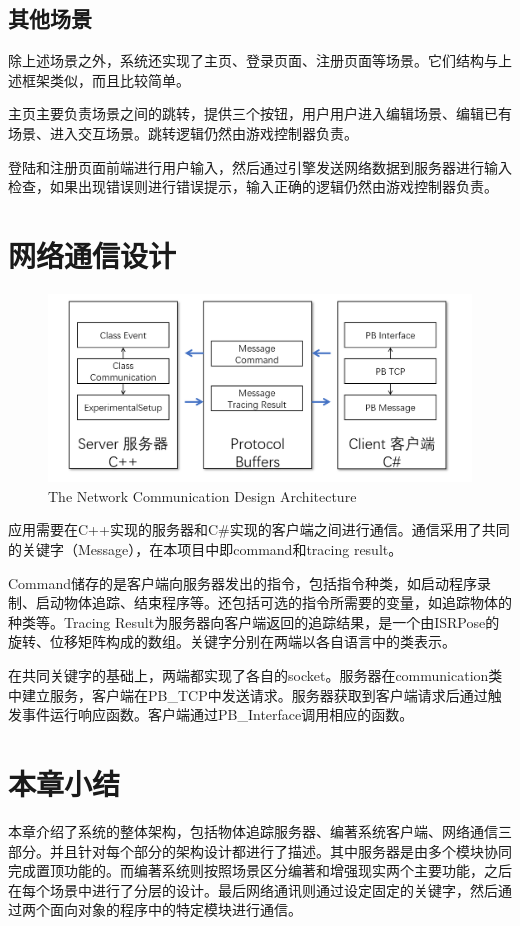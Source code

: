 \subsection{其他场景}
除上述场景之外，系统还实现了主页、登录页面、注册页面等场景。它们结构与上述框架类似，而且比较简单。

主页主要负责场景之间的跳转，提供三个按钮，用户用户进入编辑场景、编辑已有场景、进入交互场景。跳转逻辑仍然由游戏控制器负责。

登陆和注册页面前端进行用户输入，然后通过引擎发送网络数据到服务器进行输入检查，如果出现错误则进行错误提示，输入正确的逻辑仍然由游戏控制器负责。

\section{网络通信设计}
\begin{figure}[!htp]
  \centering
  \includegraphics[width=12cm]{figure/netarc.png}
    {The Network Communication Design Architecture}
 \label{fig:gm}
\end{figure}
应用需要在C++实现的服务器和C\#实现的客户端之间进行通信。通信采用了共同的关键字（Message），在本项目中即command和tracing result。

Command储存的是客户端向服务器发出的指令，包括指令种类，如启动程序录制、启动物体追踪、结束程序等。还包括可选的指令所需要的变量，如追踪物体的种类等。Tracing Result为服务器向客户端返回的追踪结果，是一个由ISRPose的旋转、位移矩阵构成的数组。关键字分别在两端以各自语言中的类表示。

在共同关键字的基础上，两端都实现了各自的socket。服务器在communication类中建立服务，客户端在PB\_TCP中发送请求。服务器获取到客户端请求后通过触发事件运行响应函数。客户端通过PB\_Interface调用相应的函数。

\section{本章小结}
本章介绍了系统的整体架构，包括物体追踪服务器、编著系统客户端、网络通信三部分。并且针对每个部分的架构设计都进行了描述。其中服务器是由多个模块协同完成置顶功能的。而编著系统则按照场景区分编著和增强现实两个主要功能，之后在每个场景中进行了分层的设计。最后网络通讯则通过设定固定的关键字，然后通过两个面向对象的程序中的特定模块进行通信。
